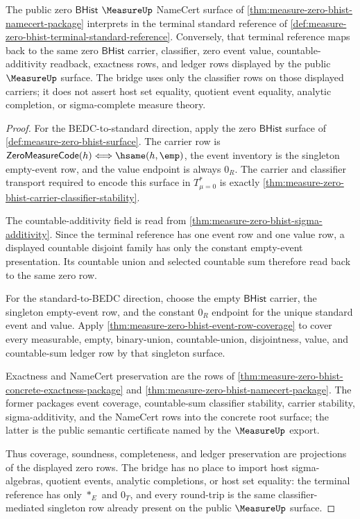 \begin{theorem}
\label{thm:measure-zero-bhist-terminal-standard-bridge}
The public zero $\mathsf{BHist}$ $\MeasureUp$ NameCert surface of
\autoref{thm:measure-zero-bhist-namecert-package} interprets in the terminal
standard reference of
\autoref{def:measure-zero-bhist-terminal-standard-reference}. Conversely, that
terminal reference maps back to the same zero $\mathsf{BHist}$ carrier,
classifier, zero event value, countable-additivity readback, exactness rows,
and ledger rows displayed by the public $\MeasureUp$ surface. The bridge uses
only the classifier rows on those displayed carriers; it does not assert host
set equality, quotient event equality, analytic completion, or sigma-complete
measure theory.
\end{theorem}
\begin{proof}
For the BEDC-to-standard direction, apply the zero $\mathsf{BHist}$ surface of
\autoref{def:measure-zero-bhist-surface}. The carrier row is
$\mathsf{ZeroMeasureCode}(h)\Longleftrightarrow\hsame(h,\emp)$, the event
inventory is the singleton empty-event row, and the value endpoint is always
$0_R$. The carrier and classifier transport required to encode this surface in
$T_{\mu=0}^{\ast}$ is exactly
\autoref{thm:measure-zero-bhist-carrier-classifier-stability}.

The countable-additivity field is read from
\autoref{thm:measure-zero-bhist-sigma-additivity}. Since the terminal reference
has one event row and one value row, a displayed countable disjoint family has
only the constant empty-event presentation. Its countable union and selected
countable sum therefore read back to the same zero row.

For the standard-to-BEDC direction, choose the empty $\mathsf{BHist}$ carrier,
the singleton empty-event row, and the constant $0_R$ endpoint for the unique
standard event and value. Apply
\autoref{thm:measure-zero-bhist-event-row-coverage} to cover every measurable,
empty, binary-union, countable-union, disjointness, value, and countable-sum
ledger row by that singleton surface.

Exactness and NameCert preservation are the rows of
\autoref{thm:measure-zero-bhist-concrete-exactness-package} and
\autoref{thm:measure-zero-bhist-namecert-package}. The former packages event
coverage, countable-sum classifier stability, carrier stability,
sigma-additivity, and the NameCert rows into the concrete root surface; the
latter is the public semantic certificate named by the $\MeasureUp$ export.

Thus coverage, soundness, completeness, and ledger preservation are projections
of the displayed zero rows. The bridge has no place to import host
sigma-algebras, quotient events, analytic completions, or host set equality:
the terminal reference has only $\ast_E$ and $0_T$, and every round-trip is the
same classifier-mediated singleton row already present on the public
$\MeasureUp$ surface.
\end{proof}

